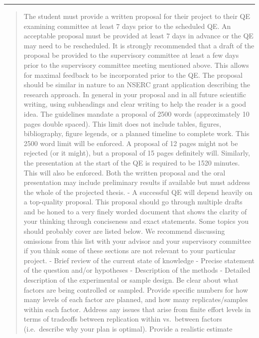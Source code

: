 \documentclass[11pt]{article}
\begin{document}
\begin{center}\rule{0.5\linewidth}{0.5pt}\end{center}

\begin{quote}
The student must provide a written proposal for their project to their
QE examining committee at least 7 days prior to the scheduled QE. An
acceptable proposal must be provided at least 7 days in advance or the
QE may need to be rescheduled. It is strongly recommended that a draft
of the proposal be provided to the supervisory committee at least a few
days prior to the supervisory committee meeting mentioned above. This
allows for maximal feedback to be incorporated prior to the QE. The
proposal should be similar in nature to an NSERC grant application
describing the research approach. In general in your proposal and in all
future scientific writing, using subheadings and clear writing to help
the reader is a good idea. The guidelines mandate a proposal of 2500
words (approximately 10 pages double spaced). This limit does not
include tables, figures, bibliography, figure legends, or a planned
timeline to complete work. This 2500 word limit will be enforced. A
proposal of 12 pages might not be rejected (or it might), but a proposal
of 15 pages definitely will. Similarly, the presentation at the start of
the QE is required to be 1520 minutes. This will also be enforced. Both
the written proposal and the oral presentation may include preliminary
results if available but must address the whole of the projected thesis.
- A successful QE will depend heavily on a top-quality proposal. This
proposal should go through multiple drafts and be honed to a very finely
worded document that shows the clarity of your thinking through
conciseness and exact statements. Some topics you should probably cover
are listed below. We recommend discussing omissions from this list with
your advisor and your supervisory committee if you think some of these
sections are not relevant to your particular project. - Brief review of
the current state of knowledge - Precise statement of the question
and/or hypotheses - Description of the methods - Detailed description of
the experimental or sample design. Be clear about what factors are being
controlled or sampled. Provide specific numbers for how many levels of
each factor are planned, and how many replicates/samples within each
factor. Address any issues that arise from finite effort levels in terms
of tradeoffs between replication within vs.~between factors
(i.e.~describe why your plan is optimal). Provide a realistic estimate

\end{quote}
\end{document}
